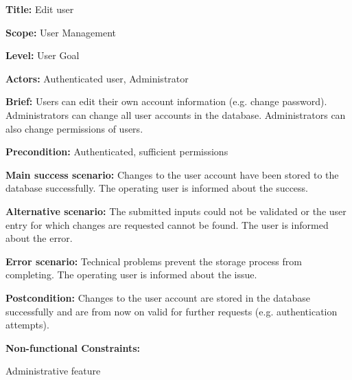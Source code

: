 
\begin{DoxyItemize}
\item {\bfseries Title\+:} Edit user
\item {\bfseries Scope\+:} User Management
\item {\bfseries Level\+:} User Goal
\item {\bfseries Actors\+:} Authenticated user, Administrator
\item {\bfseries Brief\+:} Users can edit their own account information (e.\+g. change password). Administrators can change all user accounts in the database. Administrators can also change permissions of users.
\end{DoxyItemize}


\begin{DoxyItemize}
\item {\bfseries Precondition\+:} Authenticated, sufficient permissions
\item {\bfseries Main success scenario\+:} Changes to the user account have been stored to the database successfully. The operating user is informed about the success.
\item {\bfseries Alternative scenario\+:} The submitted inputs could not be validated or the user entry for which changes are requested cannot be found. The user is informed about the error.
\item {\bfseries Error scenario\+:} Technical problems prevent the storage process from completing. The operating user is informed about the issue.
\item {\bfseries Postcondition\+:} Changes to the user account are stored in the database successfully and are from now on valid for further requests (e.\+g. authentication attempts).
\item {\bfseries Non-\/functional Constraints\+:}
\begin{DoxyItemize}
\item Administrative feature 
\end{DoxyItemize}
\end{DoxyItemize}